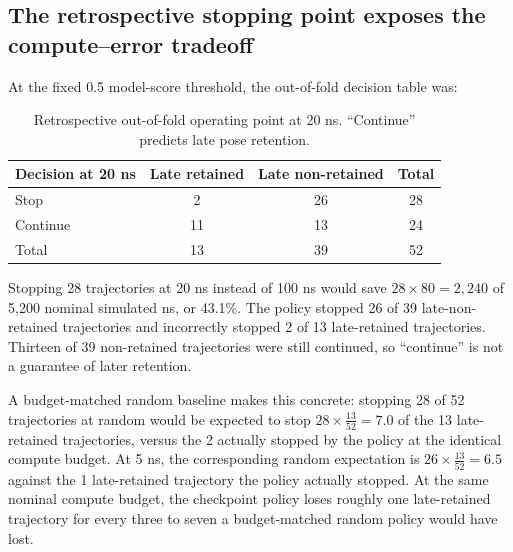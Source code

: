 \documentclass[11pt]{article}
\begin{document}
\subsection{The retrospective stopping point exposes the compute--error tradeoff}

At the fixed 0.5 model-score threshold, the out-of-fold decision table was:

\begin{table}[htbp]
\centering
\caption{Retrospective out-of-fold operating point at 20 ns. ``Continue'' predicts late pose retention.}
\label{tab:policy}
\begin{tabular}{lccc}
\toprule
Decision at 20 ns & Late retained & Late non-retained & Total \\
\midrule
Stop & 2 & 26 & 28 \\
Continue & 11 & 13 & 24 \\
\midrule
Total & 13 & 39 & 52 \\
\bottomrule
\end{tabular}
\end{table}

Stopping 28 trajectories at 20 ns instead of 100 ns would save $28\times80=2{,}240$ of 5,200 nominal simulated ns, or 43.1\%. The policy stopped 26 of 39 late-non-retained trajectories and incorrectly stopped 2 of 13 late-retained trajectories. Thirteen of 39 non-retained trajectories were still continued, so ``continue'' is not a guarantee of later retention.

A budget-matched random baseline makes this concrete: stopping 28 of 52 trajectories at random would be expected to stop $28\times\frac{13}{52}=7.0$ of the 13 late-retained trajectories, versus the 2 actually stopped by the policy at the identical compute budget. At 5 ns, the corresponding random expectation is $26\times\frac{13}{52}=6.5$ against the 1 late-retained trajectory the policy actually stopped. At the same nominal compute budget, the checkpoint policy loses roughly one late-retained trajectory for every three to seven a budget-matched random policy would have lost.
\end{document}
